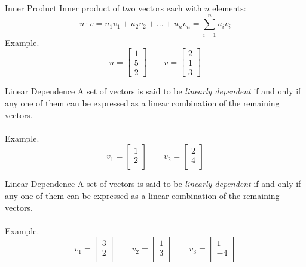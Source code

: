 \documentclass{./../../Latex/teaching_slides}
\begin{document}
\begin{frame}{Inner Product}
Inner product of two vectors each with $n$ elements:
$$ u \cdot v = u_1 v_1 + u_2 v_2 +...+ u_n v_n = \sum_{i=1}^n u_i v_i $$ 
Example. $$u = \begin{bmatrix} 1 \\ 5 \\ 2 \end{bmatrix} \quad \quad v = \begin{bmatrix} 2 \\ 1 \\ 3 \end{bmatrix}$$
\end{frame}

\begin{frame}{Linear Dependence}
A set of vectors is said to be \textit{linearly dependent} if and only if any one of them can be expressed as a linear combination of the remaining vectors. \\~\\
Example.$$ v_1 =  \begin{bmatrix}
1\\
2 \\
\end{bmatrix} \quad \quad v_2 = \begin{bmatrix}
2\\
4 \\
\end{bmatrix}$$
\end{frame}

\begin{frame}{Linear Dependence}
A set of vectors is said to be \textit{linearly dependent} if and only if any one of them can be expressed as a linear combination of the remaining vectors. \\~\\
Example.$$ v_1 =  \begin{bmatrix}
3\\
2 \\
\end{bmatrix} \quad \quad v_2 = \begin{bmatrix}
1\\
3 \\
\end{bmatrix} \quad \quad v_3 = \begin{bmatrix}
1\\
-4 \\
\end{bmatrix} $$
\end{frame}
\end{document}
